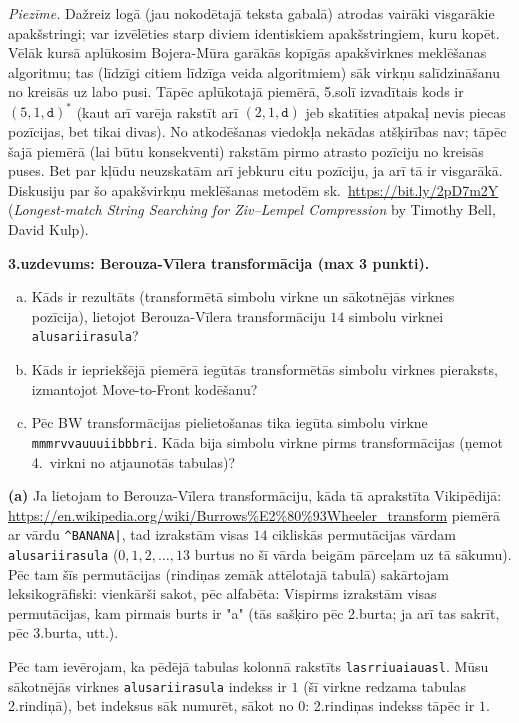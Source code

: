 \documentclass[11pt]{article}
\begin{document}
{\em Piezīme.} Dažreiz logā (jau nokodētajā teksta gabalā) atrodas vairāki visgarākie
apakšstringi; var izvēlēties starp diviem identiskiem apakšstringiem, kuru kopēt. 
Vēlāk kursā aplūkosim Bojera-Mūra garākās kopīgās apakšvirknes meklēšanas algoritmu; tas (līdzīgi 
citiem līdzīga veida algoritmiem) sāk virkņu salīdzināšanu no kreisās uz labo pusi. 
Tāpēc aplūkotajā piemērā, 5.solī izvadītais kods ir $(5,1,\mathtt{d})^{\ast}$
(kaut arī varēja rakstīt arī $(2,1,\mathtt{d})$ jeb skatīties atpakaļ nevis piecas pozīcijas, bet tikai divas). 
No atkodēšanas viedokļa nekādas atšķirības nav; tāpēc šajā piemērā (lai būtu konsekventi) rakstām 
pirmo atrasto pozīciju no kreisās puses. Bet par kļūdu neuzskatām arī jebkuru citu pozīciju, ja 
arī tā ir visgarākā. Diskusiju par šo apakšvirkņu meklēšanas metodēm sk.\ 
\url{https://bit.ly/2pD7m2Y} ({\em Longest-match String Searching for Ziv–Lempel Compression} by 
Timothy Bell, David Kulp). 


{\footnotesize
\vspace{10ex}
\noindent
{\bf 3.uzdevums: Berouza-Vīlera transformācija (max 3 punkti).}
\begin{enumerate}[(a)]
\item Kāds ir rezultāts (transformētā simbolu virkne un 
sākotnējās virknes pozīcija), lietojot 
Berouza-Vīlera transformāciju 
$14$ simbolu virknei {\tt alusariirasula}?
\item Kāds ir iepriekšējā piemērā iegūtās transformētās simbolu virknes pieraksts,
izmantojot Move-to-Front kodēšanu?
\item Pēc BW transformācijas pielietošanas tika iegūta simbolu virkne 
{\tt mmmrvvauuuiibbbri}. Kāda bija simbolu virkne pirms 
transformācijas (ņemot 4.\ virkni
no atjaunotās tabulas)?
\end{enumerate}
}


\noindent
{\bf (a)} Ja lietojam to Berouza-Vīlera transformāciju, kāda tā aprakstīta 
Vikipēdijā: \url{https://en.wikipedia.org/wiki/Burrows%E2%80%93Wheeler_transform} 
\textendash piemērā ar vārdu {\tt \^{}BANANA|}, tad 
izrakstām visas $14$ cikliskās permutācijas vārdam {\tt alusariirasula}
($0,1,2,\ldots,13$ burtus no šī vārda beigām pārceļam uz tā sākumu). Pēc tam 
šīs permutācijas (rindiņas zemāk attēlotajā tabulā) sakārtojam leksikogrāfiski: 
vienkārši sakot, pēc alfabēta: Vispirms izrakstām visas permutācijas, kam
pirmais burts ir "a" (tās sašķiro pēc 2.burta; ja arī tas sakrīt, pēc 3.burta, utt.). 

Pēc tam ievērojam, ka pēdējā tabulas kolonnā rakstīts  {\tt lasrriuaiauasl}. 
Mūsu sākotnējās virknes {\tt alusariirasula} indekss ir $1$ (šī 
virkne redzama tabulas 2.rindiņā), bet indeksus sāk
numurēt, sākot no $0$: 2.rindiņas indekss tāpēc ir $1$. 
\end{document}
